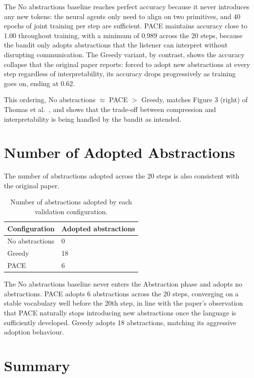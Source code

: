 The No abstractions baseline reaches perfect accuracy because it never introduces any new tokens: the neural agents only need to align on two primitives, and 40 epochs of joint training per step are sufficient. PACE maintains accuracy close to 1.00 throughout training, with a minimum of 0.989 across the 20 steps, because the bandit only adopts abstractions that the listener can interpret without disrupting communication. The Greedy variant, by contrast, shows the accuracy collapse that the original paper reports: forced to adopt new abstractions at every step regardless of interpretability, its accuracy drops progressively as training goes on, ending at 0.62.

This ordering, No abstractions $\approx$ PACE $>$ Greedy, matches Figure 3 (right) of Thomas et al.~\cite{thomas_pace_2025}, and shows that the trade-off between compression and interpretability is being handled by the bandit as intended.

\section{Number of Adopted Abstractions}
\label{sec:appendix-adopted-abstractions}

The number of abstractions adopted across the 20 steps is also consistent with the original paper.

\begin{table}[htbp]
\centering
\begin{tabular}{ll}
\toprule
Configuration & Adopted abstractions \\
\midrule
No abstractions & 0 \\
Greedy & 18 \\
PACE & 6 \\
\bottomrule
\end{tabular}
\caption{Number of abstractions adopted by each validation configuration.}
\label{tab:appendix-adopted-abstractions}
\end{table}

The No abstractions baseline never enters the Abstraction phase and adopts no abstractions. PACE adopts 6 abstractions across the 20 steps, converging on a stable vocabulary well before the 20th step, in line with the paper's observation that PACE naturally stops introducing new abstractions once the language is sufficiently developed. Greedy adopts 18 abstractions, matching its aggressive adoption behaviour.

\section{Summary}
\label{sec:appendix-validation-summary}


